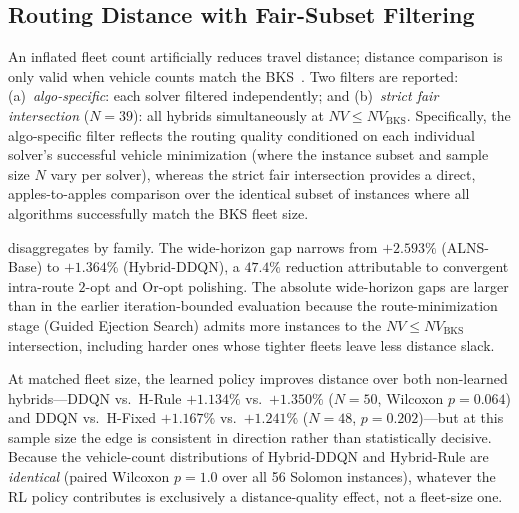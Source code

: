 \documentclass[conference]{IEEEtran}
\newcommand{\BKS}{\text{BKS}}
\begin{document}
\begin{table}[!t]
\centering

\end{table}

\subsection{Routing Distance with Fair-Subset Filtering}

An inflated fleet count artificially reduces travel distance; distance
comparison is only valid when vehicle counts match the
BKS~\cite{pisinger2007general}.  Two filters are reported:
(a)~\emph{algo-specific}: each solver filtered independently; and
(b)~\emph{strict fair intersection} ($N=39$): all hybrids simultaneously at
$NV\le NV_{\BKS}$.
Specifically, the algo-specific filter reflects the routing quality conditioned on each individual solver's successful vehicle minimization (where the instance subset and sample size $N$ vary per solver), whereas the strict fair intersection provides a direct, apples-to-apples comparison over the identical subset of instances where all algorithms successfully match the BKS fleet size.

\begin{table}[!t]
\centering

\end{table}

 disaggregates by family.
The wide-horizon gap narrows from $+2.593\%$ (ALNS-Base) to
$\mathbf{+1.364\%}$ (Hybrid-DDQN), a $47.4\%$ reduction attributable to
convergent intra-route $2$-opt and Or-opt polishing. The absolute wide-horizon
gaps are larger than in the earlier iteration-bounded evaluation because the
route-minimization stage (Guided Ejection Search) admits
more instances to the $NV\le NV_{\BKS}$ intersection, including harder ones whose
tighter fleets leave less distance slack.

\begin{table}[!t]
\centering

\end{table}

\begin{table}[!t]
\centering

\end{table}

At matched fleet size, the learned policy improves distance over both non-learned
hybrids---DDQN vs.\ H-Rule $+1.134\%$ vs.\ $+1.350\%$ ($N{=}50$, Wilcoxon
$p=0.064$) and DDQN vs.\ H-Fixed $+1.167\%$ vs.\ $+1.241\%$ ($N{=}48$,
$p=0.202$)---but at this sample size the edge is consistent in direction rather
than statistically decisive. Because the vehicle-count distributions of
Hybrid-DDQN and Hybrid-Rule are \emph{identical} (paired Wilcoxon $p=1.0$ over all
56 Solomon instances), whatever the RL policy contributes is exclusively a
distance-quality effect, not a fleet-size one.
\end{document}
